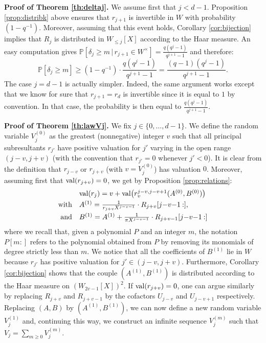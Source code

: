 \documentclass{jT}
\numberwithin{equation}{section}
\DeclareMathOperator{\val}{val}
\theoremstyle{definition}
\renewcommand{\val}{\text{\rm val}}
\renewcommand{\P}{\mathbb P}
\newcommand{\A}{W}
\begin{document}
\noindent
\textbf{Proof of Theorem \ref{th:deltaj}.}
We assume first that $j < d-1$. Proposition \ref{prop:distribk} above 
ensures that $r_{j+1}$ is invertible in $\A$ with probability 
$(1 - q^{-1})$. Moreover, assuming that this event holds, Corollary 
\ref{cor:bijection} implies that $R_j$ is distributed in $\A_{\leq 
j}[X]$ according to the Haar measure. An easy computation gives
$\P[\delta_j \geq m\,|\, r_{j+1} \in \A^\times ] =
\frac{q(q^j - 1)}{q^{j+1}-1}$
and therefore:
$$\P[\delta_j \geq m] \geq (1 - q^{-1}) \cdot
\frac{q(q^j - 1)}{q^{j+1}-1} =
\frac{(q-1)(q^j - 1)}{q^{j+1}-1}.$$
The case $j = d-1$ is actually simpler. Indeed, the same argument works 
except that we know for sure that $r_{j+1} = r_d$ is invertible since it 
is equal to $1$ by convention. In that case, the probability is then 
equal to $\frac{q(q^j - 1)}{q^{j+1}-1}$.

\medskip

\noindent
\textbf{Proof of Theorem \ref{th:lawVj}.}
We fix $j \in \{0, \ldots, d-1\}$. 
We define the random variable $V_j^{(0)}$ as the greatest (nonnegative) 
integer $v$ such that all principal subresultants $r_{j'}$ have positive 
valuation for $j'$ varying in the open range $(j-v, j+v)$ (with the
convention that $r_{j'} = 0$ whenever $j' < 0$). It is clear from the 
definition that $r_{j-v}$ or $r_{j+v}$ (with $v = V_j^{(0)}$) has 
valuation $0$. Moreover, assuming first that $\val(r_{j+v}) = 0$, we 
get by Proposition \ref{prop:relations}:
$$\begin{array}{rl}
& \val(r_j) = v + \val\big(r_v^{j-v,j-v+1}(A^{(0)}, B^{(0)})\big) 
\smallskip \\
\text{with} &
A^{(1)} = \frac 1 {r_{j+v} X^{j-v-1}} \cdot R_{j+v}[j{-}v{-}1\:{:}], \smallskip \\
\text{and} &
B^{(1)} = A^{(1)} + \frac 1 {\pi X^{j-v-1}} \cdot R_{j+v-1}[j{-}v{-}1\:{:}]
\end{array}$$
where we recall that, given a polynomial $P$ and an integer $m$, the 
notation $P[m{:}]$ refers to the polynomial obtained from $P$ by
removing its monomials of degree strictly less than $m$.
We notice that all the coefficients of $B^{(1)}$ lie in $\A$ 
because $r_{j'}$ has positive valuation for $j' \in (j-v, j+v)$.
Furthermore, Corollary \ref{cor:bijection} shows that the 
couple $(A^{(1)}, B^{(1)})$ is distributed according to the Haar measure 
on $(\A_{2v-1}[X])^2$. If $\val(r_{j+v}) = 0$, one can argue similarly 
by replacing $R_{j+v}$ and $R_{j+v-1}$ by the cofactors $U_{j-v}$ and 
$U_{j-v+1}$ respectively. Replacing $(A,B)$ by $(A^{(1)}, B^{(1)})$, we 
can now define a new random variable $V_j^{(1)}$ and, continuing this 
way, we construct an infinite sequence $V_j^{(m)}$ such that
$V_j = \sum_{m \geq 0} V_j^{(m)}$.
\end{document}
